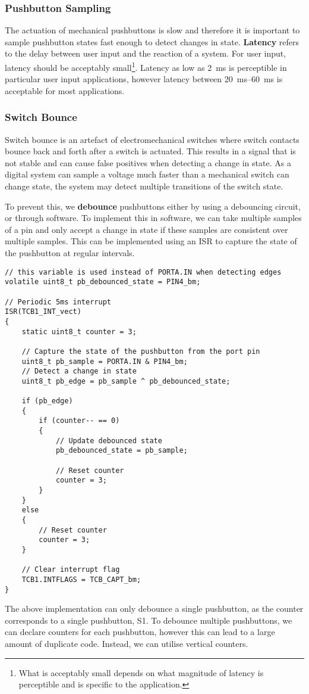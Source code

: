 \documentclass{article}
\begin{document}
\subsubsection{Pushbutton Sampling}
The actuation of mechanical pushbuttons is slow and therefore it is
important to sample pushbutton states fast enough to detect changes in
state. \textbf{Latency} refers to the delay between user input and the
reaction of a system. For user input, latency should be acceptably
small\footnote{What is acceptably small depends on what magnitude of
latency is perceptible and is specific to the application.}. Latency as
low as \qty{2}{ms} is perceptible in particular user input applications,
however latency between \qtyrange{20}{60}{ms} is acceptable for most
applications.
\subsubsection{Switch Bounce}
Switch bounce is an artefact of electromechanical switches where switch
contacts bounce back and forth after a switch is actuated. This
results in a signal that is not stable and can cause false positives
when detecting a change in state. As a digital system can sample a
voltage much faster than a mechanical switch can change state, the
system may detect multiple transitions of the switch state.

To prevent this, we \textbf{debounce} pushbuttons either by
using a debouncing circuit, or through software. To implement this in
software, we can take multiple samples of a pin and only accept a change
in state if these samples are consistent over multiple samples. This can
be implemented using an ISR to capture the state of the pushbutton at
regular intervals.
\begin{verbatim}
// this variable is used instead of PORTA.IN when detecting edges
volatile uint8_t pb_debounced_state = PIN4_bm;

// Periodic 5ms interrupt
ISR(TCB1_INT_vect)
{
    static uint8_t counter = 3;

    // Capture the state of the pushbutton from the port pin
    uint8_t pb_sample = PORTA.IN & PIN4_bm;
    // Detect a change in state
    uint8_t pb_edge = pb_sample ^ pb_debounced_state;

    if (pb_edge)
    {
        if (counter-- == 0)
        {
            // Update debounced state
            pb_debounced_state = pb_sample;

            // Reset counter
            counter = 3;
        }
    }
    else
    {
        // Reset counter
        counter = 3;
    }

    // Clear interrupt flag
    TCB1.INTFLAGS = TCB_CAPT_bm;
}
\end{verbatim}
The above implementation can only debounce a single pushbutton, as the
counter corresponds to a single pushbutton, S1. To debounce multiple
pushbuttons, we can declare counters for each pushbutton, however this
can lead to a large amount of duplicate code. Instead, we can utilise
vertical counters.
\end{document}
